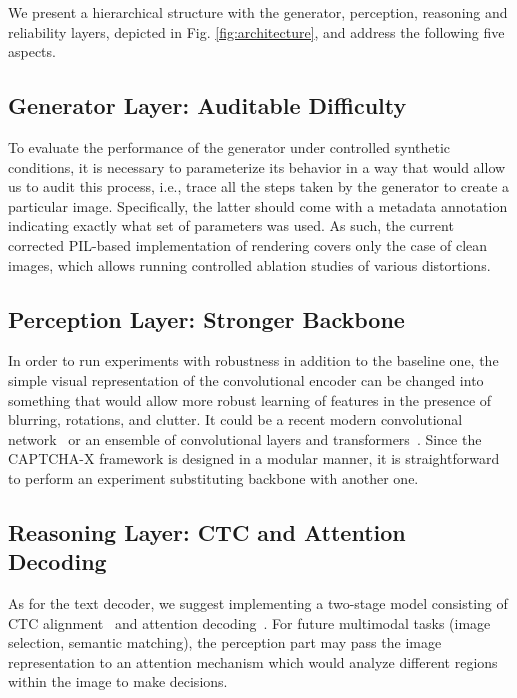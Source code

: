\documentclass[pdflatex,sn-mathphys-num,iicol]{sn-jnl}
\begin{document}
We present a hierarchical structure with the generator, perception, reasoning and reliability layers, depicted in Fig. \ref{fig:architecture}, and address the following five aspects.

\subsection{Generator Layer: Auditable Difficulty}

To evaluate the performance of the generator under controlled synthetic conditions, it is necessary to parameterize its behavior in a way that would allow us to audit this process, i.e., trace all the steps taken by the generator to create a particular image. Specifically, the latter should come with a metadata annotation indicating exactly what set of parameters was used. As such, the current corrected PIL-based implementation of rendering covers only the case of clean images, which allows running controlled ablation studies of various distortions.

\subsection{Perception Layer: Stronger Backbone}

In order to run experiments with robustness in addition to the baseline one, the simple visual representation of the convolutional encoder can be changed into something that would allow more robust learning of features in the presence of blurring, rotations, and clutter. It could be a recent modern convolutional network~\cite{liu2022convnext} or an ensemble of convolutional layers and transformers~\cite{dosovitskiy2021vit}. Since the CAPTCHA-X framework is designed in a modular manner, it is straightforward to perform an experiment substituting backbone with another one.

\subsection{Reasoning Layer: CTC and Attention Decoding}

As for the text decoder, we suggest implementing a two-stage model consisting of CTC alignment~\cite{graves2006ctc} and attention decoding~\cite{vaswani2017attention}. For future multimodal tasks (image selection, semantic matching), the perception part may pass the image representation to an attention mechanism which would analyze different regions within the image to make decisions.
\end{document}

